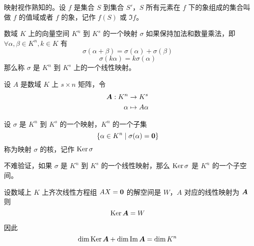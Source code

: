 映射视作熟知的。设 $f$ 是集合 $S$ 到集合 $S'$，$S$ 所有元素在 $f$ 下的象组成的集合叫做 $f$ 的值域或者 $f$ 的象，记作 $f(S)$ 或 $\Im f$。

\begin{definition}
	数域 $K$ 上的向量空间 $K^n$ 到 $K^s$ 的一个映射 $\sigma$ 如果保持加法和数量乘法，即 $\forall \alpha,\beta \in K^n,k\in K$ 有
	\[\sigma (\alpha+\beta) = \sigma(\alpha) + \sigma(\beta)\]
	\[\sigma(k\alpha) = k\sigma(\alpha)\]
	那么称 $\sigma$ 是 $K^n$ 到 $K^s$ 上的一个线性映射。
\end{definition}

设 $A$ 是数域 $K$ 上 $s \times n$ 矩阵，令
\begin{equation*}
	\begin{aligned}
		\boldsymbol{A} : K^n & \rightarrow K^s  \\
		\alpha        & \mapsto A\alpha
	\end{aligned}
\end{equation*}


\begin{definition}
	设 $\sigma$ 是 $K^n$ 到 $K^s$ 的一个映射，$K^n$ 的一个子集
	\[ \{ \alpha \in K^n \mid \sigma(\alpha) = \boldsymbol{0} \} \]
	称为映射 $\sigma$ 的核，记作 $\operatorname{Ker} \sigma$
\end{definition}

不难验证，如果 $\sigma$ 是 $K^n$ 到 $K^s$ 的一个线性映射，那么 $\operatorname{Ker} \sigma$ 是 $K^n$ 的一个子空间。

\begin{theorem}
	设数域上 $K$ 上齐次线性方程组 $AX = \boldsymbol{0}$ 的解空间是 $W$，$A$ 对应的线性映射为 $\boldsymbol{A}$ 则
	\[ \operatorname{Ker} \boldsymbol{A} = W \]
\end{theorem}

因此
\[ \dim \operatorname{Ker} \boldsymbol{A} + \dim \operatorname{Im} \boldsymbol{A} = \dim K^n \]
